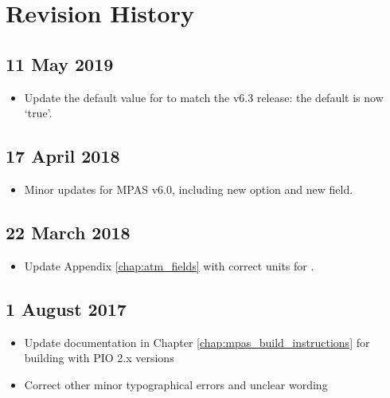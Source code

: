 
\chapter{Revision History}


\section*{11 May 2019}

\begin{itemize}
\item Update the default value for  to match the v6.3 release: the default is now `true'.
\end{itemize}

\section*{17 April 2018}

\begin{itemize}
\item Minor updates for MPAS v6.0, including new  option and new  field.
\end{itemize}

\section*{22 March 2018}

\begin{itemize}
\item Update Appendix \ref{chap:atm_fields} with correct units for .
\end{itemize}

\section*{1 August 2017}

\begin{itemize}
\item Update documentation in Chapter \ref{chap:mpas_build_instructions} for building with PIO 2.x versions
\item Correct other minor typographical errors and unclear wording
\end{itemize}

